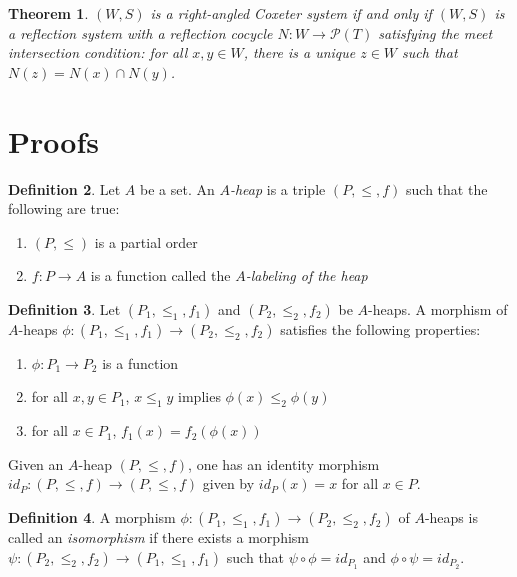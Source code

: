 \documentclass{amsart}
\theoremstyle{plain} %
\newtheorem{thm}{Theorem}[section]
\theoremstyle{definition}
\newtheorem{defi}[thm]{Definition}
\begin{document}
\begin{thm} \label{gimenezracsthm}
    $ (W,S)$ is a right-angled Coxeter system if and only if $ (W,S)$ is a reflection system with a reflection cocycle $ N: W \rightarrow \mathcal{P}(T)$ satisfying the \emph{meet intersection condition}: for all $ x,y\in W$, there is a unique $ z \in W$ such that $ N(z) = N(x) \cap N(y)$.
\end{thm}

\section{Proofs}

\begin{defi}
    Let $ A$ be a set. An \emph{$A$-heap} is a triple $ (P, \leq , f)$ such that the following are true:

    \begin{enumerate}
        \item $(P , \leq )$ is a partial order

        \item $f: P \rightarrow A$ is a function called the \emph{$A$-labeling of the heap}
    \end{enumerate}
\end{defi}

\begin{defi}
    Let $( P_{1}, \leq_{1} , f_{1})$ and $ (P_{2} , \leq_{2} , f_{2})$ be $A$-heaps. A morphism of $ A$-heaps $ \phi: ( P_{1}, \leq_{1} , f_{1}) \rightarrow (P_{2} , \leq_{2} , f_{2})$ satisfies the following properties:

    \begin{enumerate}
        \item $ \phi : P_{1} \rightarrow P_{2}$ is a function
        
        \item for all $ x,y \in P_{1}$, $ x \leq_{1} y$ implies $ \phi(x) \leq_{2} \phi(y)$

        \item for all $ x \in P_{1}$, $ f_{1}(x) = f_{2}(\phi(x))$
    \end{enumerate}
\end{defi}
Given an $ A$-heap $ (P , \leq , f)$, one has an identity morphism $ id_{P} : (P , \leq , f) \rightarrow (P , \leq , f) $ given by $ id_{P}(x) = x$ for all $ x \in P$.

\begin{defi}
    A morphism $ \phi : (P_{1}, \leq_{1} , f_{1}) \rightarrow (P_{2}, \leq_{2}, f_{2})$ of $ A$-heaps is called an \emph{isomorphism} if there exists a morphism $ \psi : (P_{2}, \leq_{2}, f_{2}) \rightarrow (P_{1}, \leq_{1}, f_{1})$ such that $ \psi \circ \phi = id_{P_{1}}$ and $ \phi \circ \psi = id_{P_{2}}$.
\end{defi}
\end{document}

